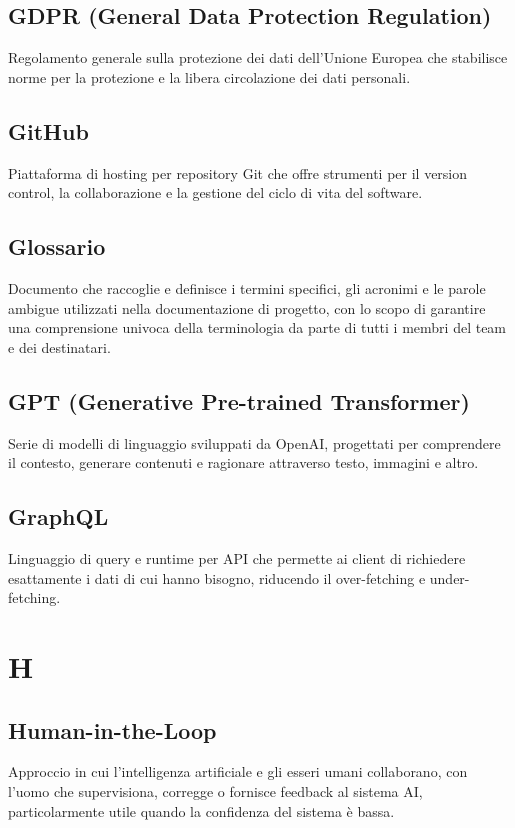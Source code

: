 \documentclass[a4paper,11pt]{article}
\begin{document}
\subsection{GDPR (General Data Protection Regulation)}
Regolamento generale sulla protezione dei dati dell'Unione Europea che stabilisce norme per la protezione e la libera circolazione dei dati personali.

\subsection{GitHub}
Piattaforma di hosting per repository Git che offre strumenti per il version control, la collaborazione e la gestione del ciclo di vita del software.

\subsection{Glossario}
Documento che raccoglie e definisce i termini specifici, gli acronimi e le parole ambigue utilizzati nella documentazione di progetto, con lo scopo di garantire una comprensione univoca della terminologia da parte di tutti i membri del team e dei destinatari.

\subsection{GPT (Generative Pre-trained Transformer)}
Serie di modelli di linguaggio sviluppati da OpenAI, progettati per comprendere il contesto, generare contenuti e ragionare attraverso testo, immagini e altro.

\subsection{GraphQL}
Linguaggio di query e runtime per API che permette ai client di richiedere esattamente i dati di cui hanno bisogno, riducendo il over-fetching e under-fetching.

\newpage
\section{H}

\subsection{Human-in-the-Loop}
Approccio in cui l'intelligenza artificiale e gli esseri umani collaborano, con l'uomo che supervisiona, corregge o fornisce feedback al sistema AI, particolarmente utile quando la confidenza del sistema è bassa.
\end{document}
